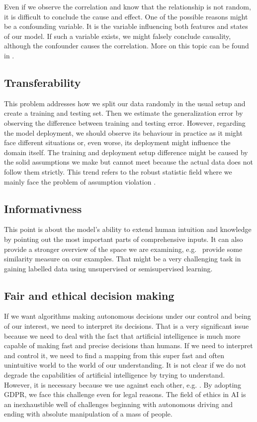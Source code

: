 Even if we observe the correlation and know that the relationship is not random, it is difficult to conclude the cause and effect. One of the possible reasons might be a confounding variable. It is the variable influencing both features and states of our model. If such a variable exists, we might falsely conclude causality, although the confounder causes the correlation. More on this topic can be found in \cite{Skelly2012}.

\subsection{Transferability}
This problem addresses how we split our data randomly in the usual setup and create a training and testing set. Then we estimate the generalization error by observing the difference between training and testing error. However, regarding the model deployment, we should observe its behaviour in practice as it might face different situations or, even worse, its deployment might influence the domain itself. The training and deployment setup difference might be caused by the solid assumptions we make but cannot meet because the actual data does not follow them strictly. This trend refers to the robust statistic field where we mainly face the problem of assumption violation \cite{Erceg-Hurn2008}.

\subsection{Informativness}
This point is about the model's ability to extend human intuition and knowledge by pointing out the most important parts of comprehensive inputs. It can also provide a stronger overview of the space we are examining, e.g. \ provide some similarity measure on our examples. That might be a very challenging task in gaining labelled data using unsupervised or semisupervised learning.

\subsection{Fair and ethical decision making}
If we want algorithms making autonomous decisions under our control and being of our interest, we need to interpret its decisions. That is a very significant issue because we need to deal with the fact that artificial intelligence is much more capable of making fast and precise decisions than humans. If we need to interpret and control it, we need to find a mapping from this super fast and often unintuitive world to the world of our understanding. It is not clear if we do not degrade the capabilities of artificial intelligence by trying to understand. However, it is necessary because we use against each other, e.g. \cite{Boldyreva2018}. By adopting GDPR, we face this challenge even for legal reasons. The field of ethics in AI \cite{Siau2020} is an inexhaustible well of challenges beginning with autonomous driving and ending with absolute manipulation of a mass of people.


